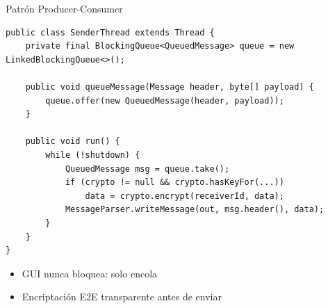 \documentclass[aspectratio=169,14pt]{beamer}
\begin{document}
\begin{frame}[fragile]{Patrón Producer-Consumer}
\begin{lstlisting}[style=java,basicstyle=\ttfamily\tiny]
public class SenderThread extends Thread {
    private final BlockingQueue<QueuedMessage> queue = new LinkedBlockingQueue<>();

    public void queueMessage(Message header, byte[] payload) {
        queue.offer(new QueuedMessage(header, payload));
    }

    public void run() {
        while (!shutdown) {
            QueuedMessage msg = queue.take();
            if (crypto != null && crypto.hasKeyFor(...))
                data = crypto.encrypt(receiverId, data);
            MessageParser.writeMessage(out, msg.header(), data);
        }
    }
}
\end{lstlisting}

\begin{itemize}
  \item GUI nunca bloquea: solo encola
  \item Encriptación E2E transparente antes de enviar
\end{itemize}
\end{frame}
\end{document}
